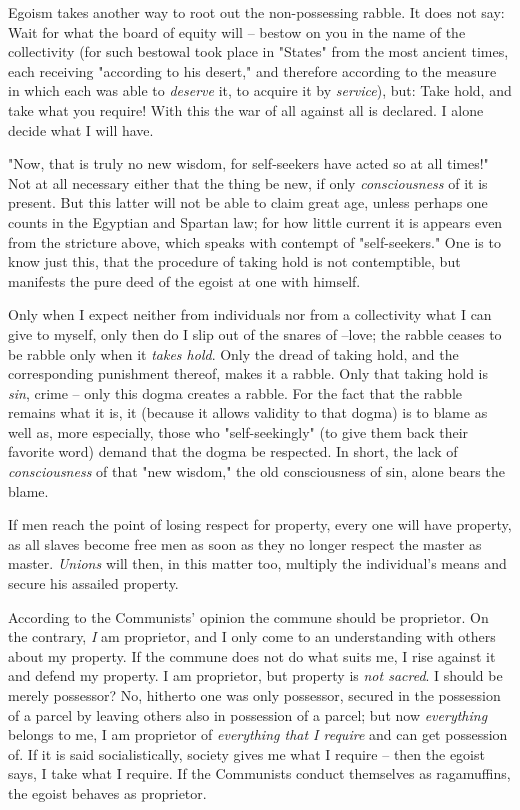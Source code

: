 \documentclass[a4paper]{book}
\begin{document}
Egoism takes another way to root out the non-possessing rabble. It does not 
say: Wait for what the board of equity will -- bestow on you in the name of 
the collectivity (for such bestowal took place in "{}States"{} from the most 
ancient times, each receiving "{}according to his desert,"{} and therefore 
according to the measure in which each was able to \textit{deserve} it, to 
acquire it by \textit{service}), but: Take hold, and take what you require! 
With this the war of all against all is declared. I alone decide what I will 
have.

"{}Now, that is truly no new wisdom, for self-seekers have acted so at all 
times!"{} Not at all necessary either that the thing be new, if only 
\textit{consciousness} of it is present. But this latter will not be able to 
claim great age, unless perhaps one counts in the Egyptian and Spartan law; 
for how little current it is appears even from the stricture above, which 
speaks with contempt of "{}self-seekers."{} One is to know just this, that the 
procedure of taking hold is not contemptible, but manifests the pure deed of 
the egoist at one with himself.

Only when I expect neither from individuals nor from a collectivity what I can 
give to myself, only then do I slip out of the snares of --love; the rabble 
ceases to be rabble only when it \textit{takes hold}. Only the dread of taking 
hold, and the corresponding punishment thereof, makes it a rabble. Only that 
taking hold is \textit{sin}, crime -- only this dogma creates a rabble. For 
the fact that the rabble remains what it is, it (because it allows validity to 
that dogma) is to blame as well as, more especially, those who 
"{}self-seekingly"{} (to give them back their favorite word) demand that the 
dogma be respected. In short, the lack of \textit{consciousness} of that 
"{}new wisdom,"{} the old consciousness of sin, alone bears the blame.

If men reach the point of losing respect for property, every one will have 
property, as all slaves become free men as soon as they no longer respect the 
master as master. \textit{Unions} will then, in this matter too, multiply the 
individual's means and secure his assailed property.

According to the Communists' opinion the commune should be proprietor. On the 
contrary, \textit{I} am proprietor, and I only come to an understanding with 
others about my property. If the commune does not do what suits me, I rise 
against it and defend my property. I am proprietor, but property is 
\textit{not sacred}. I should be merely possessor? No, hitherto one was only 
possessor, secured in the possession of a parcel by leaving others also in 
possession of a parcel; but now \textit{everything} belongs to me, I am 
proprietor of \textit{everything that I require} and can get possession of. If 
it is said socialistically, society gives me what I require -- then the egoist 
says, I take what I require. If the Communists conduct themselves as 
ragamuffins, the egoist behaves as proprietor.
\end{document}

